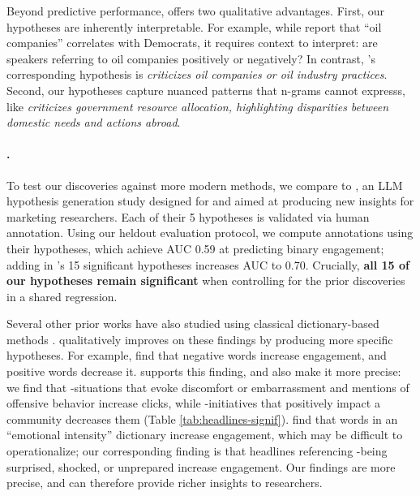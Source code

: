 Beyond predictive performance, \ourmethod offers two qualitative advantages. 
First, our hypotheses are inherently interpretable. For example, while \citet{gentzkow_measuring_2016} report that ``oil companies'' correlates with Democrats, it requires context to interpret: are speakers referring to oil companies positively or negatively? In contrast, \ourmethod's corresponding hypothesis is \textit{criticizes oil companies or oil industry practices}. 
Second, our hypotheses capture nuanced patterns that n-grams cannot expresss, like \textit{criticizes government resource allocation, highlighting disparities between domestic needs and actions abroad}.




\paragraph{\headlines.} 
To test our discoveries against more modern methods, we compare to \citet{batista_words_2024}, an LLM hypothesis generation study designed for \headlines and aimed at producing new insights for marketing researchers. 
Each of their 5 hypotheses is validated via human annotation.
Using our heldout evaluation protocol, we compute annotations using their hypotheses, which achieve AUC 0.59 at predicting binary engagement; adding in \ourmethod's 15 significant hypotheses increases AUC to 0.70.
Crucially, \textbf{all 15 of our hypotheses remain significant} when controlling for the prior discoveries in a shared regression.

Several other prior works have also studied \headlines using classical dictionary-based methods \citep{robertson_negativity_2023, gligoric_linguistic_2023, banerjee_language_2024, aubinlequere_when_2025}. 
\ourmethod qualitatively improves on these findings by producing more specific hypotheses.
For example, \citet{robertson_negativity_2023} find that negative words increase engagement, and positive words decrease it.
\ourmethod supports this finding, and also make it more precise: we find that \hyp{situations that evoke discomfort or embarrassment} and mentions of offensive behavior increase clicks, while \hyp{initiatives that positively impact a community} decreases them (Table \ref{tab:headlines-signif}).
\citet{banerjee_language_2024} find that words in an ``emotional intensity'' dictionary increase engagement, which may be difficult to operationalize; our corresponding finding is that headlines referencing \hyp{being surprised, shocked, or unprepared} increase engagement.
Our findings are more precise, and can therefore provide richer insights to researchers.




